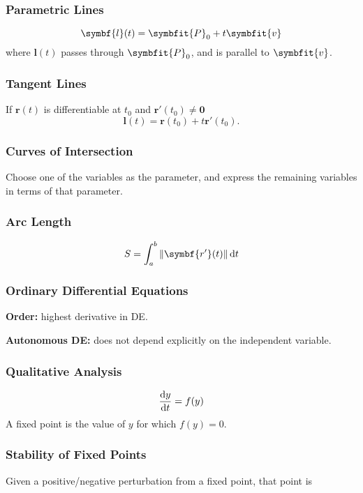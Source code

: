 \documentclass{article}
\begin{document}
\begin{multicols}{3}
    \subsubsection*{Parametric Lines}
    \begin{equation*}
        \symbf{l}(t) = \symbfit{P}_0 + t\symbfit{v}
    \end{equation*}
    where $\symbf{l}(t)$ passes through $\symbfit{P}_0$, and is parallel to $\symbfit{v}$.
    \subsubsection*{Tangent Lines}
    If $\symbf{r}(t)$ is differentiable at
    $t_0$ and $\symbf{r'}(t_0)\ne\symbf{0}$
    \begin{equation*}
        \symbf{l}(t) = \symbf{r}(t_0)+t\symbf{r'}(t_0).
    \end{equation*}
    \subsubsection*{Curves of Intersection}
    Choose one of the variables as the parameter, and express the remaining variables in terms of that parameter.
    \subsubsection*{Arc Length}
    \begin{equation*}
        S = \int_a^b \norm{\symbf{r'}(t)} \dd{t}
    \end{equation*}
    \subsubsection*{Ordinary Differential Equations}
    \textbf{Order:} highest derivative in DE.

    \textbf{Autonomous DE:} does not depend explicitly on the independent variable.
    \subsubsection*{Qualitative Analysis}
    \begin{equation*}
        \dv{y}{t} = f(y)
    \end{equation*}
    A fixed point is the value of $y$ for which $f(y) = 0$.
    \subsubsection*{Stability of Fixed Points}
    Given a positive/negative perturbation from a fixed point, that point is


\end{multicols}
\end{document}
